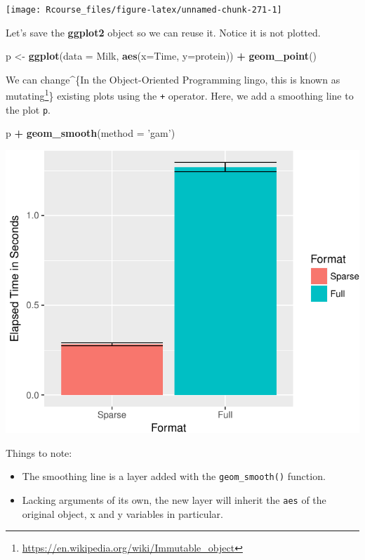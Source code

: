 \documentclass[]{book}
\newenvironment{Shaded}{\begin{snugshade}}{\end{snugshade}}
\newcommand{\DataTypeTok}[1]{\textcolor[rgb]{0.13,0.29,0.53}{#1}}
\newcommand{\KeywordTok}[1]{\textcolor[rgb]{0.13,0.29,0.53}{\textbf{#1}}}
\newcommand{\NormalTok}[1]{#1}
\newcommand{\OperatorTok}[1]{\textcolor[rgb]{0.81,0.36,0.00}{\textbf{#1}}}
\newcommand{\StringTok}[1]{\textcolor[rgb]{0.31,0.60,0.02}{#1}}
\providecommand{\tightlist}{%
  \setlength{\itemsep}{0pt}\setlength{\parskip}{0pt}}
\renewcommand{\href}[2]{#2\footnote{\url{#1}}}
\theoremstyle{definition}
\theoremstyle{definition}
\theoremstyle{definition}
\theoremstyle{remark}
\begin{document}
\texttt{[image: Rcourse\_files/figure-latex/unnamed-chunk-271-1]}

Let's save the \textbf{ggplot2} object so we can reuse it.
Notice it is not plotted.

\begin{Shaded}
\begin{Highlighting}[]
\NormalTok{p <-}\StringTok{ }\KeywordTok{ggplot}\NormalTok{(}\DataTypeTok{data =}\NormalTok{ Milk, }\KeywordTok{aes}\NormalTok{(}\DataTypeTok{x=}\NormalTok{Time, }\DataTypeTok{y=}\NormalTok{protein)) }\OperatorTok{+}
\StringTok{  }\KeywordTok{geom_point}\NormalTok{()}
\end{Highlighting}
\end{Shaded}

We can change\^{}\{In the Object-Oriented Programming lingo, this is known as \href{https://en.wikipedia.org/wiki/Immutable_object}{mutating}\} existing plots using the \texttt{+} operator.
Here, we add a smoothing line to the plot \texttt{p}.

\begin{Shaded}
\begin{Highlighting}[]
\NormalTok{p }\OperatorTok{+}\StringTok{ }\KeywordTok{geom_smooth}\NormalTok{(}\DataTypeTok{method =} \StringTok{'gam'}\NormalTok{)}
\end{Highlighting}
\end{Shaded}

\includegraphics[width=0.5\linewidth]{Rcourse_files/figure-latex/unnamed-chunk-273-1}

Things to note:

\begin{itemize}
\tightlist
\item
  The smoothing line is a layer added with the \texttt{geom\_smooth()} function.
\item
  Lacking arguments of its own, the new layer will inherit the \texttt{aes} of the original object, x and y variables in particular.
\end{itemize}
\end{document}

